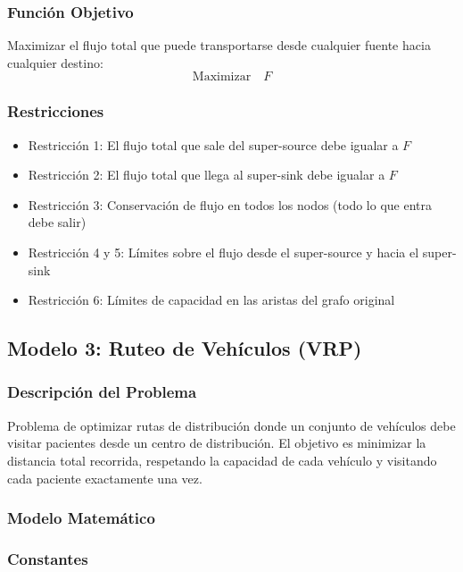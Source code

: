 \documentclass[12pt]{article}
\begin{document}
\subsubsection*{Función Objetivo}

Maximizar el flujo total que puede transportarse desde cualquier fuente hacia cualquier destino:
\[
\text{Maximizar} \quad F
\]

\subsubsection*{Restricciones}

\begin{itemize}
    \item Restricción 1: El flujo total que sale del super-source debe igualar a $F$
    \item Restricción 2: El flujo total que llega al super-sink debe igualar a $F$
    \item Restricción 3: Conservación de flujo en todos los nodos (todo lo que entra debe salir)
    \item Restricción 4 y 5: Límites sobre el flujo desde el super-source y hacia el super-sink
    \item Restricción 6: Límites de capacidad en las aristas del grafo original
\end{itemize}

\subsection{Modelo 3: Ruteo de Vehículos (VRP)}

\subsubsection{Descripción del Problema}

Problema de optimizar rutas de distribución donde un conjunto de vehículos debe visitar pacientes desde un centro de distribución. El objetivo es minimizar la distancia total recorrida, respetando la capacidad de cada vehículo y visitando cada paciente exactamente una vez.

\subsubsection{Modelo Matemático}

\subsubsection*{Constantes}
\end{document}
